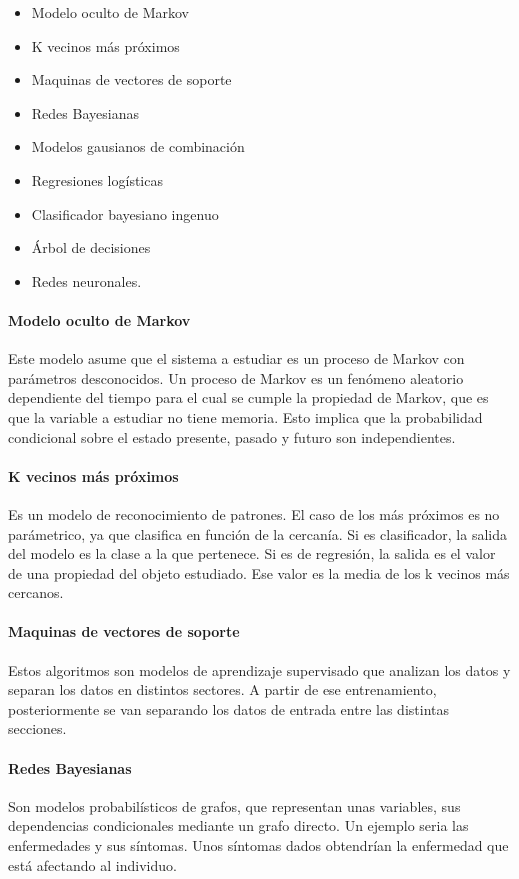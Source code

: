 \documentclass[12pt]{book}
\numberwithin{equation}{section}
\begin{document}
\begin{itemize}
\item Modelo oculto de Markov
\item K vecinos más próximos
\item Maquinas de vectores de soporte
\item Redes Bayesianas
\item Modelos gausianos de combinación
\item Regresiones logísticas
\item Clasificador bayesiano ingenuo
\item Árbol de decisiones
\item Redes neuronales.
\end{itemize}

\paragraph{Modelo oculto de Markov} Este modelo asume que el sistema a estudiar es un proceso de Markov con parámetros desconocidos. Un proceso de Markov es un fenómeno aleatorio dependiente del tiempo para el cual se cumple la propiedad de Markov, que es que la variable a estudiar no tiene memoria. Esto implica que la probabilidad condicional sobre el estado presente, pasado y futuro son independientes.

\paragraph{K vecinos más próximos} Es un modelo de reconocimiento de patrones. El caso de los más próximos es no parámetrico, ya que clasifica en función de la cercanía. Si es clasificador, la salida del modelo es la clase a la que pertenece. Si es de regresión, la salida es el valor de una propiedad del objeto estudiado. Ese valor es la media de los k vecinos más cercanos.

\paragraph{Maquinas de vectores de soporte} Estos algoritmos son modelos de aprendizaje supervisado que analizan los datos y separan los datos en distintos sectores. A partir de ese entrenamiento, posteriormente se van separando los datos de entrada entre las distintas secciones.

\paragraph{Redes Bayesianas} Son modelos probabilísticos de grafos, que representan unas variables, sus dependencias condicionales mediante un grafo directo. Un ejemplo seria las enfermedades y sus síntomas. Unos síntomas dados obtendrían la enfermedad que está afectando al individuo.
\end{document}
